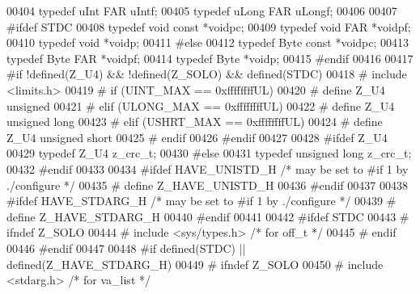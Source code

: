 \begin{DoxyCode}
00404 \textcolor{keyword}{typedef} uInt  FAR uIntf;
00405 \textcolor{keyword}{typedef} uLong FAR uLongf;
00406 
00407 \textcolor{preprocessor}{#ifdef STDC}
00408    \textcolor{keyword}{typedef} \textcolor{keywordtype}{void} \textcolor{keyword}{const} *voidpc;
00409    \textcolor{keyword}{typedef} \textcolor{keywordtype}{void} FAR   *voidpf;
00410    \textcolor{keyword}{typedef} \textcolor{keywordtype}{void}       *voidp;
00411 \textcolor{preprocessor}{#else}
00412    \textcolor{keyword}{typedef} Byte \textcolor{keyword}{const} *voidpc;
00413    \textcolor{keyword}{typedef} Byte FAR   *voidpf;
00414    \textcolor{keyword}{typedef} Byte       *voidp;
00415 \textcolor{preprocessor}{#endif}
00416 
00417 \textcolor{preprocessor}{#if !defined(Z\_U4) && !defined(Z\_SOLO) && defined(STDC)}
00418 \textcolor{preprocessor}{#  include <limits.h>}
00419 \textcolor{preprocessor}{#  if (UINT\_MAX == 0xffffffffUL)}
00420 \textcolor{preprocessor}{#    define Z\_U4 unsigned}
00421 \textcolor{preprocessor}{#  elif (ULONG\_MAX == 0xffffffffUL)}
00422 \textcolor{preprocessor}{#    define Z\_U4 unsigned long}
00423 \textcolor{preprocessor}{#  elif (USHRT\_MAX == 0xffffffffUL)}
00424 \textcolor{preprocessor}{#    define Z\_U4 unsigned short}
00425 \textcolor{preprocessor}{#  endif}
00426 \textcolor{preprocessor}{#endif}
00427 
00428 \textcolor{preprocessor}{#ifdef Z\_U4}
00429    \textcolor{keyword}{typedef} Z\_U4 z\_crc\_t;
00430 \textcolor{preprocessor}{#else}
00431    \textcolor{keyword}{typedef} \textcolor{keywordtype}{unsigned} \textcolor{keywordtype}{long} z\_crc\_t;
00432 \textcolor{preprocessor}{#endif}
00433 
00434 \textcolor{preprocessor}{#ifdef HAVE\_UNISTD\_H    }\textcolor{comment}{/* may be set to #if 1 by ./configure */}\textcolor{preprocessor}{}
00435 \textcolor{preprocessor}{#  define Z\_HAVE\_UNISTD\_H}
00436 \textcolor{preprocessor}{#endif}
00437 
00438 \textcolor{preprocessor}{#ifdef HAVE\_STDARG\_H    }\textcolor{comment}{/* may be set to #if 1 by ./configure */}\textcolor{preprocessor}{}
00439 \textcolor{preprocessor}{#  define Z\_HAVE\_STDARG\_H}
00440 \textcolor{preprocessor}{#endif}
00441 
00442 \textcolor{preprocessor}{#ifdef STDC}
00443 \textcolor{preprocessor}{#  ifndef Z\_SOLO}
00444 \textcolor{preprocessor}{#    include <sys/types.h>}      \textcolor{comment}{/* for off\_t */}
00445 \textcolor{preprocessor}{#  endif}
00446 \textcolor{preprocessor}{#endif}
00447 
00448 \textcolor{preprocessor}{#if defined(STDC) || defined(Z\_HAVE\_STDARG\_H)}
00449 \textcolor{preprocessor}{#  ifndef Z\_SOLO}
00450 \textcolor{preprocessor}{#    include <stdarg.h>}         \textcolor{comment}{/* for va\_list */}

\end{DoxyCode}
